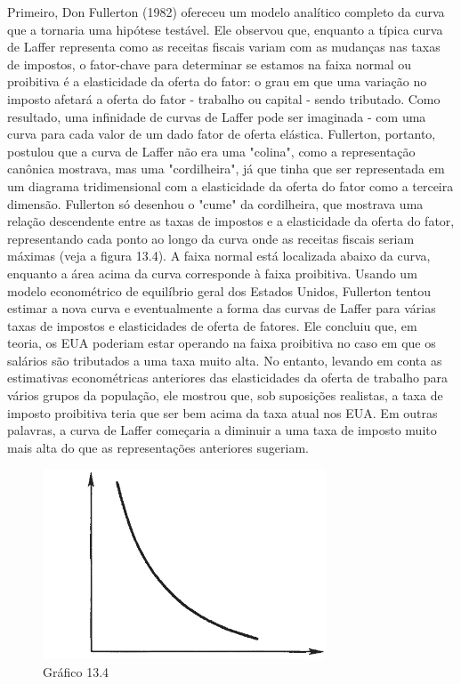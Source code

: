 \documentclass[a4paper,12pt]{article}[abntex2]
\begin{document}
Primeiro, Don Fullerton (1982) ofereceu um modelo analítico completo da curva que a tornaria uma hipótese testável. Ele observou que, enquanto a típica curva de Laffer representa como as receitas fiscais variam com as mudanças nas taxas de impostos, o fator-chave para determinar se estamos na faixa normal ou proibitiva é a elasticidade da oferta do fator: o grau em que uma variação no imposto afetará a oferta do fator - trabalho ou capital - sendo tributado. Como resultado, uma infinidade de curvas de Laffer pode ser imaginada - com uma curva para cada valor de um dado fator de oferta elástica. Fullerton, portanto, postulou que a curva de Laffer não era uma "colina", como a representação canônica mostrava, mas uma "cordilheira", já que tinha que ser representada em um diagrama tridimensional com a elasticidade da oferta do fator como a terceira dimensão. Fullerton só desenhou o "cume" da cordilheira, que mostrava uma relação descendente entre as taxas de impostos e a elasticidade da oferta do fator, representando cada ponto ao longo da curva onde as receitas fiscais seriam máximas (veja a figura 13.4). A faixa normal está localizada abaixo da curva, enquanto a área acima da curva corresponde à faixa proibitiva. Usando um modelo econométrico de equilíbrio geral dos Estados Unidos, Fullerton tentou estimar a nova curva e eventualmente a forma das curvas de Laffer para várias taxas de impostos e elasticidades de oferta de fatores. Ele concluiu que, em teoria, os EUA poderiam estar operando na faixa proibitiva no caso em que os salários são tributados a uma taxa muito alta. No entanto, levando em conta as estimativas econométricas anteriores das elasticidades da oferta de trabalho para vários grupos da população, ele mostrou que, sob suposições realistas, a taxa de imposto proibitiva teria que ser bem acima da taxa atual nos EUA. Em outras palavras, a curva de Laffer começaria a diminuir a uma taxa de imposto muito mais alta do que as representações anteriores sugeriam.

\begin{figure}[H]
    \centering
    \caption{Gráfico 13.4}
    \includegraphics[width=0.75\textwidth]{4º Período/História do Pensamento Econômico/Tradução HPE/Tradução Tópico 9.3/figura 4.png}
    \end{figure}
\end{document}
